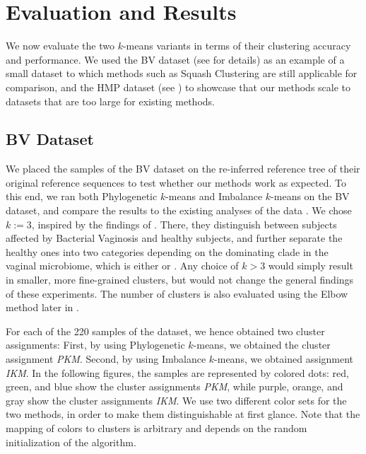 \section{Evaluation and Results}
\label{ch:Clustering:sec:Results}

We now evaluate the two $k$-means variants in terms of their clustering accuracy and performance.
We used the \acf{BV} dataset (see  for details)
as an example of a small dataset to which methods such as Squash Clustering \cite{Matsen2011a}
are still applicable for comparison,
and the \acf{HMP} dataset (see )
to showcase that our methods scale to datasets that are too large for existing methods.


\subsection{BV Dataset}
\label{ch:Clustering:sec:Results:sub:BVDataset}

We placed the samples of the \ac{BV} dataset \cite{Srinivasan2012}
on the re-inferred reference tree of their original reference sequences
to test whether our methods work as expected.
To this end, we ran both Phylogenetic $k$-means and Imbalance $k$-means on the \ac{BV} dataset,
and compare the results to the existing analyses of the data \cite{Srinivasan2012,Matsen2011a}.
We chose $k:=3$, inspired by the findings of .
There, they distinguish between subjects affected by Bacterial Vaginosis and healthy subjects,
and further separate the healthy ones into two categories depending on the dominating clade in the vaginal microbiome,
which is either  or .
Any choice of $k > 3$ would simply result in smaller, more fine-grained clusters,
but would not change the general findings of these experiments.
The number of clusters is also evaluated using the Elbow method later in .

For each of the \num{220} samples of the dataset, we hence obtained two cluster assignments:
First, by using Phylogenetic $k$-means, we obtained the cluster assignment \emph{PKM}.
Second, by using Imbalance $k$-means, we obtained assignment \emph{IKM}.
In the following figures, the samples are represented by colored dots:
red, green, and blue show the cluster assignments \emph{PKM},
while purple, orange, and gray show the cluster assignments \emph{IKM}.
We use two different color sets for the two methods, in order to make them distinguishable at first glance.
Note that the mapping of colors to clusters is arbitrary and depends on the random initialization of the algorithm.

